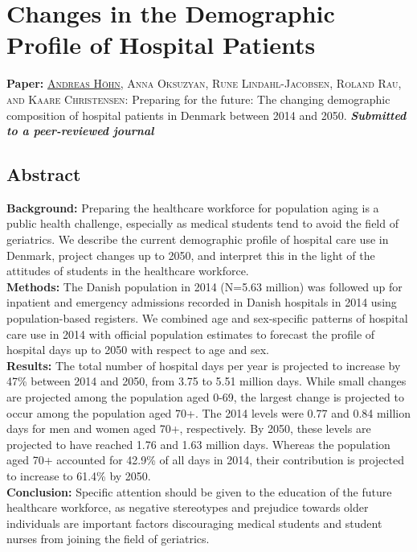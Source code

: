

\chapter{Changes in the Demographic Profile of Hospital Patients}


\vspace{0.5in}

\textbf{Paper:}
\textsc{\underline{Andreas H\"ohn}, Anna Oksuzyan, Rune Lindahl-Jacobsen, 
	    Roland Rau, and Kaare Christensen:} Preparing for the future: The 
	    changing demographic composition of hospital patients in Denmark 
	    between 2014 and 2050. \textbf{\textit{Submitted to a peer-reviewed journal}} 


\newpage

\section{Abstract}
\textbf{Background:} Preparing the healthcare workforce for 
population aging is a public health challenge, especially as 
medical students tend to avoid the field of geriatrics. We 
describe the current demographic profile of hospital care use 
in Denmark, project changes up to 2050, and interpret this in 
the light of the attitudes of students in the healthcare 
workforce.\\ 
\textbf{Methods:} The Danish population in 2014 (N=5.63 million) 
was followed up for inpatient and emergency admissions recorded 
in Danish hospitals in 2014 using population-based registers. We 
combined age and sex-specific patterns of hospital care use in 
2014 with official population estimates to forecast the profile 
of hospital days up to 2050 with respect to age and sex.\\ 
\textbf{Results:} The total number of hospital days per year is 
projected to increase by 47\% between 2014 and 2050, from 3.75 
to 5.51 million days. While small changes are projected among 
the population aged 0-69, the largest change is projected to 
occur among the population aged 70+. The 2014 levels were 0.77 and 
0.84 million days for men and women aged 70+, respectively. By 
2050, these levels are projected to have reached 1.76 and 1.63 
million days. Whereas the population aged 70+ accounted for 42.9\% 
of all days in 2014, their contribution is projected to increase 
to 61.4\% by 2050.\\
\textbf{Conclusion:} Specific attention should be given to the 
education of the future healthcare workforce, as negative 
stereotypes and prejudice towards older individuals are important 
factors discouraging medical students and student nurses from 
joining the field of geriatrics.\\


